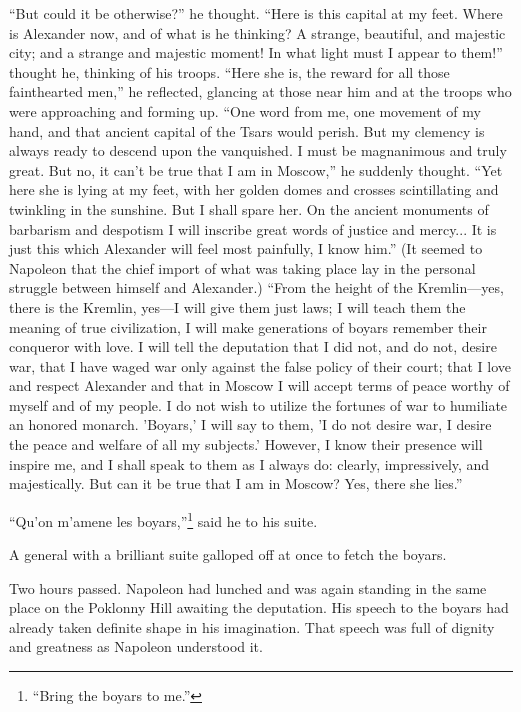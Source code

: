 ``But could it be otherwise?'' he thought. ``Here is this capital
at my feet. Where is Alexander now, and of what is he thinking? A
strange, beautiful, and majestic city; and a strange and majestic
moment! In what light must I appear to them!'' thought he,
thinking of his troops. ``Here she is, the reward for all those
fainthearted men,'' he reflected, glancing at those near him and
at the troops who were approaching and forming up. ``One word
from me, one movement of my hand, and that ancient capital of the
Tsars would perish. But my clemency is always ready to descend
upon the vanquished. I must be magnanimous and truly great. But
no, it can't be true that I am in Moscow,'' he suddenly
thought. ``Yet here she is lying at my feet, with her golden
domes and crosses scintillating and twinkling in the
sunshine. But I shall spare her. On the ancient monuments of
barbarism and despotism I will inscribe great words of justice
and mercy... It is just this which Alexander will feel most
painfully, I know him.'' (It seemed to Napoleon that the chief
import of what was taking place lay in the personal struggle
between himself and Alexander.) ``From the height of the
Kremlin---yes, there is the Kremlin, yes---I will give them just
laws; I will teach them the meaning of true civilization, I will
make generations of boyars remember their conqueror with love. I
will tell the deputation that I did not, and do not, desire war,
that I have waged war only against the false policy of their
court; that I love and respect Alexander and that in Moscow I
will accept terms of peace worthy of myself and of my people. I
do not wish to utilize the fortunes of war to humiliate an
honored monarch. 'Boyars,' I will say to them, 'I do not desire
war, I desire the peace and welfare of all my subjects.' However,
I know their presence will inspire me, and I shall speak to them
as I always do: clearly, impressively, and majestically. But can
it be true that I am in Moscow? Yes, there she lies.''

``Qu'on m'amene les boyars,''\footnote{``Bring the boyars to
me.''}  said he to his suite.

A general with a brilliant suite galloped off at once to fetch
the boyars.

Two hours passed. Napoleon had lunched and was again standing in
the same place on the Poklonny Hill awaiting the deputation. His
speech to the boyars had already taken definite shape in his
imagination. That speech was full of dignity and greatness as
Napoleon understood it.

